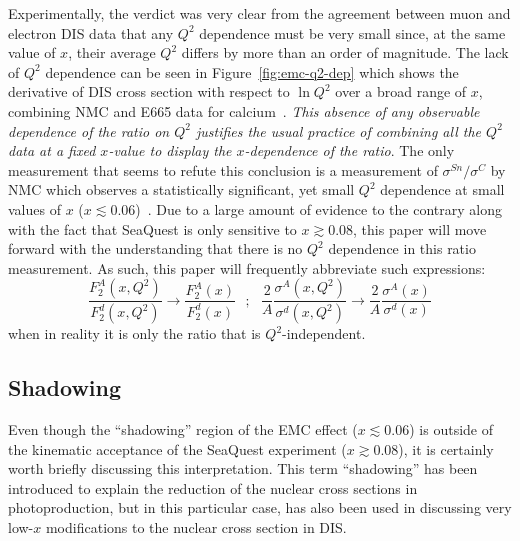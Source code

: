 Experimentally, the verdict was very clear from the agreement between muon and electron DIS data that any $Q^2$ dependence must be very small since, at the same value of $x$, their average $Q^2$ differs by more than an order of magnitude. The lack of $Q^2$ dependence can be seen in Figure~\ref{fig:emc-q2-dep} which shows the derivative of DIS cross section with respect to $\ln Q^2$ over a broad range of $x$, combining NMC and E665 data for calcium~\cite{Geesaman:1995yd}.  \emph{This absence of any observable dependence of the ratio on $Q^2$ justifies the usual practice of combining all the $Q^2$ data at a fixed $x$-value to display the $x$-dependence of the ratio}. The only measurement that seems to refute this conclusion is a measurement of $\sigma^{Sn}/\sigma^C$ by NMC which observes a statistically significant, yet small $Q^2$ dependence at small values of $x$ ($x\lesssim 0.06$)~\cite{Arneodo:1996qe}. Due to a large amount of evidence to the contrary along with the fact that SeaQuest is only sensitive to $x\gtrsim0.08$, this paper will move forward with the understanding that there is no $Q^2$ dependence in this ratio measurement. As such, this paper will frequently abbreviate such expressions:
\begin{equation}
\frac{F_2^A(x, Q^2)}{F_2^d(x, Q^2)} \rightarrow \frac{F_2^A(x)}{F_2^d(x)}\ \ \ ;\ \ \ \frac{2}{A}\frac{\sigma^A(x, Q^2)}{\sigma^d(x, Q^2)} \rightarrow \frac{2}{A} \frac{\sigma^A(x)}{\sigma^d(x)}
\end{equation}
when in reality it is only the ratio that is $Q^2$-independent.

\subsection{Shadowing}\label{sec:shadowing}

Even though the ``shadowing'' region of the EMC effect ($x\lesssim 0.06$) is outside of the kinematic acceptance of the SeaQuest experiment ($x\gtrsim0.08$), it is certainly worth briefly discussing this interpretation. This term ``shadowing'' has been introduced to explain the reduction of the nuclear cross sections in photoproduction, but in this particular case, has also been used in discussing very low-$x$ modifications to the nuclear cross section in DIS. 

